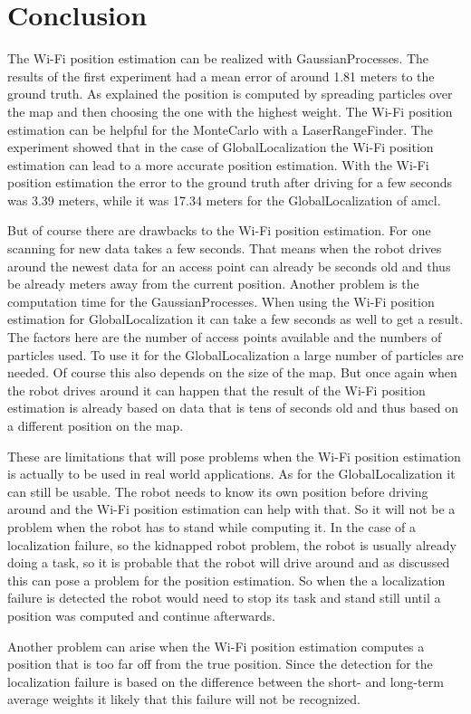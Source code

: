 \chapter{Conclusion} %
\label{Chapter5}

The Wi-Fi position estimation can be realized with \Gls{GaussianProcess}es. The results of the first experiment had a mean error of around 1.81 meters to the ground truth. As explained the position is computed by spreading particles over the map and then choosing the one with the highest weight. 
The Wi-Fi position estimation can be helpful for the \Gls{MonteCarlo} with a \gls{LaserRangeFinder}. The experiment showed that in the case of \gls{GlobalLocalization} the Wi-Fi position estimation can lead to a more accurate position estimation. With the Wi-Fi position estimation the error to the ground truth after driving for a few seconds was 3.39 meters, while it was 17.34 meters for the \gls{GlobalLocalization} of amcl. 

But of course there are drawbacks to the Wi-Fi position estimation. For one scanning for new data takes a few seconds. That means when the robot drives around the newest data for an access point can already be seconds old and thus be already meters away from the current position. Another problem is the computation time for the \Gls{GaussianProcess}es. When using the Wi-Fi position estimation for \gls{GlobalLocalization} it can take a few seconds as well to get a result. The factors here are the number of access points available and the numbers of particles used. To use it for the \gls{GlobalLocalization} a large number of particles are needed. Of course this also depends on the size of the map. But once again when the robot drives around it can happen that the result of the Wi-Fi position estimation is already based on data that is tens of seconds old and thus based on a different position on the map. 

These are limitations that will pose problems when the Wi-Fi position estimation is actually to be used in real world applications. As for the \gls{GlobalLocalization} it can still be usable. The robot needs to know its own position before driving around and the Wi-Fi position estimation can help with that. So it will not be a problem when the robot has to stand while computing it. In the case of a localization failure, so the kidnapped robot problem, the robot is usually already doing a task, so it is probable that the robot will drive around and as discussed this can pose a problem for the position estimation. So when the a localization failure is detected the robot would need to stop its task and stand still until a position was computed and continue afterwards. 

Another problem can arise when the Wi-Fi position estimation computes a position that is too far off from the true position. Since the detection for the localization failure is based on the difference between the short- and long-term average weights it likely that this failure will not be recognized.